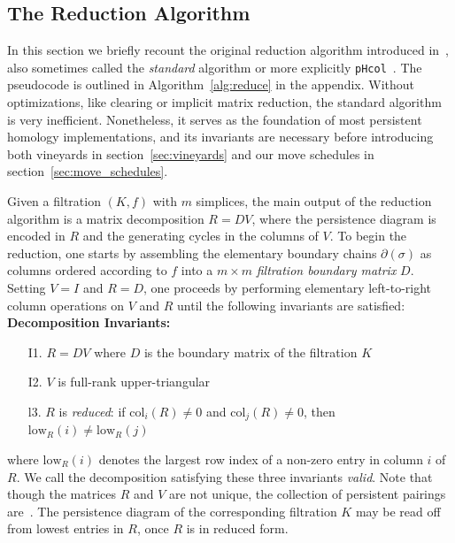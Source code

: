 \documentclass[sn-mathphys]{sn-jnl}
\begin{document}
\subsection{The Reduction Algorithm}\label{sec:reduction}
In this section we briefly recount the original reduction algorithm introduced in~\cite{zomorodian2005computing}, also sometimes called the \emph{standard} algorithm or more explicitly \texttt{pHcol}~\cite{de2011dualities}. 
The pseudocode is outlined in Algorithm~\ref{alg:reduce} in the appendix. Without optimizations, like   clearing   or implicit matrix reduction, the standard  algorithm is very inefficient. Nonetheless, it serves as the foundation of most persistent homology implementations, and its invariants are necessary before introducing both vineyards in section~\ref{sec:vineyards} and our move schedules  in section~\ref{sec:move_schedules}.


 Given a filtration $(K, f)$ with $m$ simplices,  the main output of the reduction algorithm is a matrix decomposition $R = D V$, where the persistence diagram is encoded in $R$ and the generating cycles in the columns of $V$.
 To begin the reduction, one starts by assembling the elementary boundary chains $\partial(\sigma)$ as columns ordered according to $f$ into a $m \times m$  \emph{filtration boundary matrix} $D$. Setting $V = I$ and $R = D$, one proceeds by performing elementary left-to-right column operations on $V$ and $R$ until the following invariants are satisfied:
\textbf{ Decomposition Invariants:}
 \begin{enumerate}[labelsep=3pt, topsep=2pt,itemsep=-0.25ex,parsep=1.0ex]\label{inv:decomposition}
 	\item[I1.] $R = D V$ where $D$ is the boundary matrix of the filtration $K$
 	\item[I2.] $V$ is full-rank upper-triangular
 	\item[l3.] $R$ is \emph{reduced}: if $\mathrm{col}_i(R) \neq 0$ and $\mathrm{col}_j(R) \neq 0$, then $\mathrm{low}_R(i) \neq \mathrm{low}_R(j)$ 
 	\end{enumerate} 
 \vspace*{1em}
 where $\mathrm{low}_R(i)$ denotes the largest row index of a non-zero entry in column $i$ of $R$. 
We call the decomposition satisfying these three invariants \emph{valid}. Note that though the matrices $R$ and $V$ are not unique, the collection of persistent pairings are~\cite{zomorodian2005computing}. The persistence diagram of the corresponding filtration $K$ may be read off from lowest entries in $R$, once $R$ is in reduced form.
 
\end{document}
